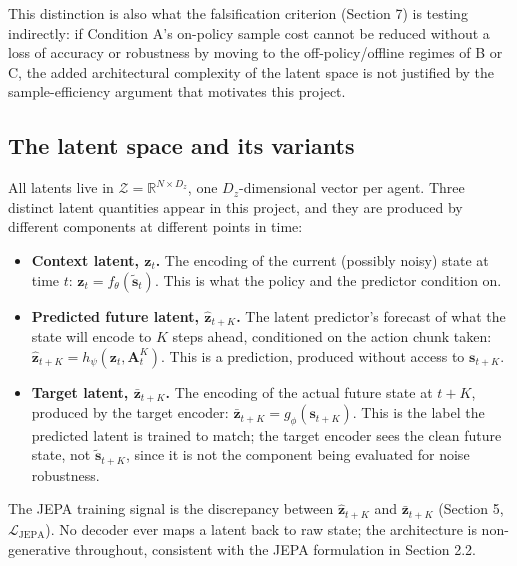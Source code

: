 \documentclass[11pt]{article}
\providecommand{\tightlist}{%
  \setlength{\itemsep}{0pt}\setlength{\parskip}{0pt}}
\begin{document}
This distinction is also what the falsification criterion (Section 7) is testing indirectly: if Condition A's on-policy sample cost cannot be reduced without a loss of accuracy or robustness by moving to the off-policy/offline regimes of B or C, the added architectural complexity of the latent space is not justified by the sample-efficiency argument that motivates this project.

\hypertarget{the-latent-space-and-its-variants}{%
\subsection{The latent space and its variants}\label{the-latent-space-and-its-variants}}

All latents live in \(\mathcal{Z} = \mathbb{R}^{N \times D_z}\), one \(D_z\)-dimensional vector per agent. Three distinct latent quantities appear in this project, and they are produced by different components at different points in time:

\begin{itemize}
\tightlist
\item
  \textbf{Context latent, \(\mathbf{z}_t\).} The encoding of the current (possibly noisy) state at time \(t\): \(\mathbf{z}_t = f_\theta(\tilde{\mathbf{s}}_t)\). This is what the policy and the predictor condition on.
\item
  \textbf{Predicted future latent, \(\hat{\mathbf{z}}_{t+K}\).} The latent predictor's forecast of what the state will encode to \(K\) steps ahead, conditioned on the action chunk taken: \(\hat{\mathbf{z}}_{t+K} = h_\psi(\mathbf{z}_t, \mathbf{A}_t^K)\). This is a prediction, produced without access to \(\mathbf{s}_{t+K}\).
\item
  \textbf{Target latent, \(\bar{\mathbf{z}}_{t+K}\).} The encoding of the actual future state at \(t+K\), produced by the target encoder: \(\bar{\mathbf{z}}_{t+K} = g_\phi(\mathbf{s}_{t+K})\). This is the label the predicted latent is trained to match; the target encoder sees the clean future state, not \(\tilde{\mathbf{s}}_{t+K}\), since it is not the component being evaluated for noise robustness.
\end{itemize}

The JEPA training signal is the discrepancy between \(\hat{\mathbf{z}}_{t+K}\) and \(\bar{\mathbf{z}}_{t+K}\) (Section 5, \(\mathcal{L}_{\text{JEPA}}\)). No decoder ever maps a latent back to raw state; the architecture is non-generative throughout, consistent with the JEPA formulation in Section 2.2.
\end{document}

